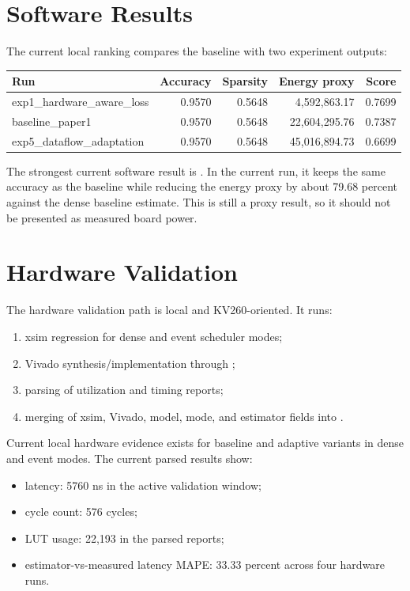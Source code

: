 \documentclass[11pt]{article}
\begin{document}
\section{Software Results}
The current local ranking compares the baseline with two experiment outputs:
\begin{center}
\begin{tabular}{lrrrr}
\toprule
Run & Accuracy & Sparsity & Energy proxy & Score \\
\midrule
exp1\_hardware\_aware\_loss & 0.9570 & 0.5648 & 4,592,863.17 & 0.7699 \\
baseline\_paper1 & 0.9570 & 0.5648 & 22,604,295.76 & 0.7387 \\
exp5\_dataflow\_adaptation & 0.9570 & 0.5648 & 45,016,894.73 & 0.6699 \\
\bottomrule
\end{tabular}
\end{center}

The strongest current software result is . In the
current run, it keeps the same accuracy as the baseline while reducing the energy
proxy by about 79.68 percent against the dense baseline estimate. This is still
a proxy result, so it should not be presented as measured board power.

\section{Hardware Validation}
The hardware validation path is local and KV260-oriented. It runs:
\begin{enumerate}[leftmargin=*]
\item xsim regression for dense and event scheduler modes;
\item Vivado synthesis/implementation through ;
\item parsing of utilization and timing reports;
\item merging of xsim, Vivado, model, mode, and estimator fields into
.
\end{enumerate}

Current local hardware evidence exists for baseline and adaptive variants in
dense and event modes. The current parsed results show:
\begin{itemize}[leftmargin=*]
\item latency: 5760 ns in the active validation window;
\item cycle count: 576 cycles;
\item LUT usage: 22,193 in the parsed reports;
\item estimator-vs-measured latency MAPE: 33.33 percent across four hardware runs.
\end{itemize}
\end{document}

